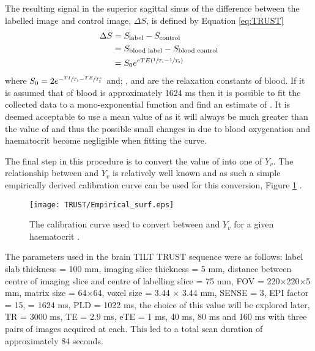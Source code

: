 The resulting signal in the superior sagittal sinus of the difference between the labelled image and control image, $\Delta S$, is defined by Equation \eqref{eq:TRUST}
\begin{align}
\Delta S&=S_{\text{label}}-S_{\text{control}}\nonumber\\
&=S_{\text{blood label}}-S_{\text{blood control}}\nonumber\\
&=S_0e^{eTE\left(\sfrac{1}{T_1}-\sfrac{1}{T_2}\right)}
\label{eq:TRUST}
\end{align}  
where $S_0=2e^{-\sfrac{TI}{T_1}-\sfrac{TE}{T_2^*}}$ and; \tone, \ttwo and \ttwostar are the relaxation constants of blood. If it is assumed that \tone of blood is approximately 1624 ms \cite{lu_determining_2004} then it is possible to fit the collected data to a mono-exponential function and find an estimate of \ttwo. It is deemed acceptable to use a mean value of \tone as it will always be much greater than the value of \ttwo and thus the possible small changes in \tone due to blood oxygenation and haematocrit become negligible when fitting the \ttwo curve.

The final step in this procedure is to convert the value of \ttwo into one of $Y_v$. The relationship between \ttwo and $Y_v$ is relatively well known and as such a simple empirically derived calibration curve can be used for this conversion, Figure \ref{fig:calibration_curve} \cite{gardener_dependence_2010, silvennoinen_comparison_2003, liu_t1_2016}.

\begin{figure}[H]
	\centering
	\texttt{[image: TRUST/Empirical\_surf.eps]}
	\caption{The calibration curve used to convert between \ttwo and $Y_v$ for a given haematocrit \cite{lu_calibration_2012}.}
	\label{fig:calibration_curve}	
\end{figure}

The parameters used in the brain \ac{TILT} \ac{TRUST} sequence were as follows: label slab thickness = 100 mm, imaging slice thickness = 5 mm, distance between centre of imaging slice and centre of labelling slice = 75 mm, \ac{FOV} = 220$\times$220$\times$5 mm, matrix size = 64$\times$64, voxel size = 3.44 $\times$ 3.44 mm, \ac{SENSE} = 3, \ac{EPI} factor = 15, \tone = 1624 ms, \ac{PLD} = 1022 ms, the choice of this value will be explored later, \ac{TR} = 3000 ms, \ac{TE} = 2.9 ms, \ac{eTE} = 1 ms, 40 ms, 80 ms and 160 ms with three pairs of images acquired at each. This led to a total scan duration of approximately 84 seconds.

